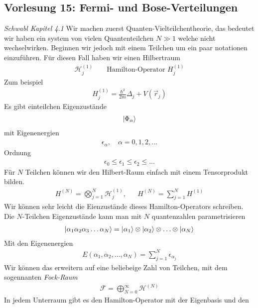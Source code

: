 \subsection*{Vorlesung 15: Fermi- und Bose-Verteilungen}
\emph{Schwabl Kapitel 4.1}
Wir machen zuerst Quanten-Vielteilchentheorie, das bedeutet wir haben ein 
system von vielen Quantenteilchen $N \gg 1$ welche nicht wechselwirken.
Beginnen wir jedoch mit einem Teilchen um ein paar notationen einzuf\"uhren.
F\"ur diesen Fall haben wir einen Hilbertraum
%
\begin{align*}
  \mathcal{H}^{(1)}_j && \text{ Hamilton-Operator } H_j^{(1)}
\end{align*}
%
Zum beispiel
%
\begin{align*}
  H_j^{(1)} = \frac{\hbar^2}{2m} \Delta_j + V(\vec{r}_j)
\end{align*}
%
Es gibt einteilchen Eigenzust\"ande
%
\begin{align*}
  \Ket{\Phi_\alpha} 
\end{align*}
%
mit Eigenenergien
%
\begin{align*}
  \epsilon_\alpha, \quad \alpha=0,1,2, \ldots
\end{align*}
%
Ordnung
%
\begin{align*}
  \epsilon_0 \le \epsilon_1 \le \epsilon_2 \le \ldots
\end{align*}
%
F\"ur $N$ Teilchen k\"onnen wir den Hilbert-Raum einfach mit einem 
Tensorprodukt bilden.
%
\begin{align*}
  H^{(N)} = \bigotimes_{j=1}^{N} \mathcal{H}_j^{(1)}, &&
  H^{(N)} = \sum_{j=1}^{N} H^{(1)}
\end{align*}
%
Wir k\"onnen sehr leicht die Eienzust\"ande dieses Hamilton-Operators
schreiben. Die $N$-Teilchen  Eigenzust\"ande kann man mit $N$ quantenzahlen
parametrisieren
%
\begin{align*}
  \Ket{\alpha_1 \alpha_2 \alpha_3 \ldots \alpha_N} = \Ket{\alpha_1}
  \otimes \Ket{\alpha_2} \otimes \ldots \otimes \Ket{\alpha_N}
\end{align*}
%
Mit den Eigenenergien
%
\begin{align*}
  E(\alpha_1, \alpha_2, \ldots, \alpha_N) = \sum_{j=1}^{N} \epsilon_{\alpha_j}
\end{align*}
%
Wir k\"onnen das erweitern auf eine beliebeige Zahl von Teilchen, mit
dem sogennanten \emph{Fock-Raum}
%
\begin{align*}
  \mathcal{F} = \bigoplus_{N=0}^{\infty} \mathcal{H}^{(N)}
\end{align*}
%
In jedem Unterraum gibt es den Hamilton-Operator mit der Eigenbasis und den

